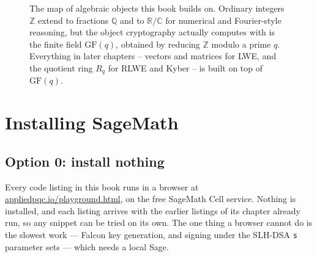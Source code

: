 \begin{figure}[H]
\centering
{}
\caption{The map of algebraic objects this book builds on. Ordinary integers $\mathbb{Z}$ extend to fractions $\mathbb{Q}$ and to $\mathbb{R}/\mathbb{C}$ for numerical and Fourier-style reasoning, but the object cryptography actually computes with is the finite field $\mathrm{GF}(q)$, obtained by reducing $\mathbb{Z}$ modulo a prime $q$. Everything in later chapters -- vectors and matrices for LWE, and the quotient ring $R_q$ for RLWE and Kyber -- is built on top of $\mathrm{GF}(q)$.}
\label{fig:number-systems}
\end{figure}

\section{Installing SageMath}

\subsection{Option 0: install nothing}
Every code listing in this book runs in a browser at
\href{\playgroundurl}{appliedpqc.io/playground.html}, on the free SageMath Cell
service. Nothing is installed, and each listing arrives with the earlier
listings of its chapter already run, so any snippet can be tried on its own.
The one thing a browser cannot do is the slowest work --- Falcon key
generation, and signing under the SLH-DSA \texttt{s} parameter sets --- which
needs a local Sage.

